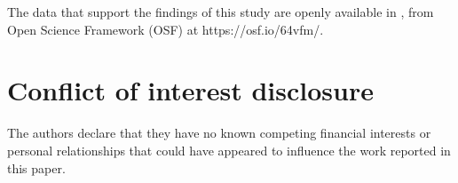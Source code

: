 \documentclass[preprint, 3p, authoryear]{elsarticle} %
\begin{document}
The data that support the findings of this study are openly available in \citet{daudt_data_2024}, from Open Science Framework (OSF) at https://osf.io/64vfm/.

\hypertarget{conflict-of-interest-disclosure}{%
\section*{Conflict of interest disclosure}\label{conflict-of-interest-disclosure}}

The authors declare that they have no known competing financial interests or personal relationships that could have appeared to influence the work reported in this paper.
\end{document}
